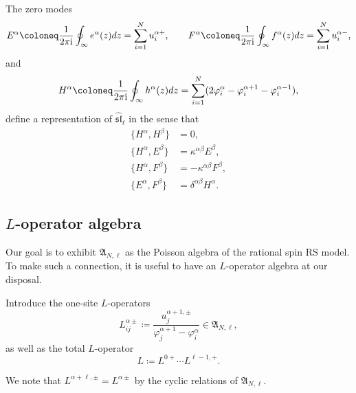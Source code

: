 \begin{corollary}
    The zero modes
    \begin{equation}
        E^\alpha \coloneq \frac{1}{2\pi\I} \oint_\infty e^\alpha(z) dz = \sum_{i=1}^N u_i^{\alpha+}, \qquad F^\alpha \coloneq \frac{1}{2\pi\I} \oint_\infty f^\alpha(z) dz = \sum_{i=1}^N u_i^{\alpha-},
    \end{equation}
    and
    \begin{equation}
        H^\alpha \coloneq \frac{1}{2\pi\I} \oint_\infty h^\alpha(z) dz = \sum_{i=1}^N (2\varphi_i^\alpha - \varphi_i^{\alpha+1} - \varphi_i^{\alpha-1}),
    \end{equation}
    define a representation of $\widehat{\mathfrak{sl}}_\ell$ in the sense that
    \begin{align}
        \{ H^\alpha,H^\beta \} &= 0,
        \\[4pt]
        \{ H^\alpha,E^\beta \} &= \kappa^{\alpha\beta} E^\beta,
        \\[4pt]
        \{ H^\alpha,F^\beta \} &= -\kappa^{\alpha\beta} F^\beta,
        \\[4pt]
        \{ E^\alpha,F^\beta \} &= \delta^{\alpha\beta} H^\alpha.
    \end{align}
\end{corollary}

\subsection{$L$-operator algebra}

Our goal is to exhibit $\mathfrak{A}_{N,\ell}$ as the Poisson algebra of the rational spin RS model. To make such a connection, it is useful to have an $L$-operator algebra at our disposal.

\begin{definition}
    Introduce the one-site $L$-operators
    \begin{equation}
        L_{ij}^{\alpha\pm} \coloneq \frac{u_j^{\alpha+1,\pm}}{\varphi_j^{\alpha+1}-\varphi_i^\alpha} \in \mathfrak{A}_{N,\ell},
    \end{equation}
    as well as the total $L$-operator
    \begin{equation}\label{eq:totLRat}
        L \coloneq L^{0+} \cdots L^{\ell-1,+}.
    \end{equation}
\end{definition}

\begin{remark}
    We note that $L^{\alpha+\ell,\pm} = L^{\alpha\pm}$ by the cyclic relations of $\mathfrak{A}_{N,\ell}$.
\end{remark}

